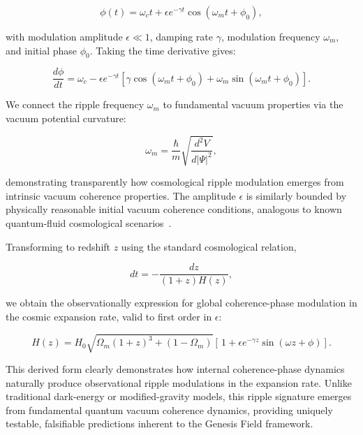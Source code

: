 \begin{equation}
\phi(t)=\omega_c t + \epsilon e^{-\gamma t}\cos(\omega_m t+\phi_0),
\label{eq:phase_modulation_solution}
\end{equation}

with modulation amplitude \(\epsilon \ll 1\), damping rate \(\gamma\), modulation frequency \(\omega_m\), and initial phase \(\phi_0\). Taking the time derivative gives:

\begin{equation}
\frac{d\phi}{dt}=\omega_c - \epsilon e^{-\gamma t}\left[\gamma\cos(\omega_m t+\phi_0)+\omega_m\sin(\omega_m t+\phi_0)\right].
\label{eq:phase_modulation_derivative}
\end{equation}

We connect the ripple frequency \(\omega_m\) to fundamental vacuum properties via the vacuum potential curvature:

\begin{equation}
\omega_m = \frac{\hbar}{m}\sqrt{\frac{d^2V}{d|\Psi|^2}},
\label{eq:omega_derivation}
\end{equation}

demonstrating transparently how cosmological ripple modulation emerges from intrinsic vacuum coherence properties. The amplitude \(\epsilon\) is similarly bounded by physically reasonable initial vacuum coherence conditions, analogous to known quantum-fluid cosmological scenarios~\cite{volovik2009,Barcelo2005}.

Transforming to redshift \(z\) using the standard cosmological relation,

\begin{equation}
dt=-\frac{dz}{(1+z)H(z)},
\label{eq:redshift_time_relation}
\end{equation}

we obtain the observationally expression for global coherence-phase modulation in the cosmic expansion rate, valid to first order in \(\epsilon\):

\begin{equation}
H(z)=H_0\sqrt{\Omega_m(1+z)^3+(1-\Omega_m)}\left[\,1+\epsilon e^{-\gamma z}\sin(\omega z+\phi)\right].
\label{eq:final_global_ripple}
\end{equation}

This derived form clearly demonstrates how internal coherence-phase dynamics naturally produce observational ripple modulations in the expansion rate. Unlike traditional dark-energy or modified-gravity models, this ripple signature emerges from fundamental quantum vacuum coherence dynamics, providing uniquely testable, falsifiable predictions inherent to the Genesis Field framework.

